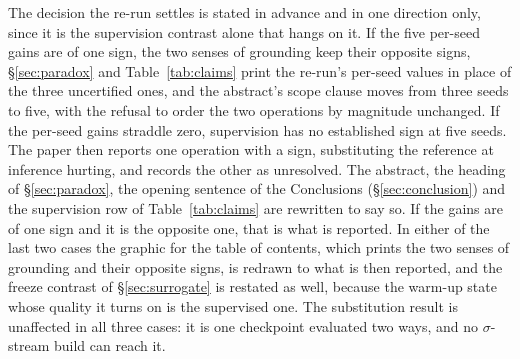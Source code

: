 The decision the re-run settles is stated in advance and in one direction only, since it is the
supervision contrast alone that hangs on it. If the five per-seed gains are of one sign, the two
senses of grounding keep their opposite signs, \S\ref{sec:paradox} and
Table~\ref{tab:claims} print the re-run's per-seed values in place of the three uncertified ones,
and the abstract's scope clause moves from three seeds to five, with the refusal to order the two
operations by magnitude unchanged. If the per-seed gains straddle zero, supervision has no established sign at five seeds. The paper
then reports one operation with a sign, substituting the reference at inference hurting, and records
the other as unresolved. The abstract, the heading of \S\ref{sec:paradox}, the opening sentence of
the Conclusions (\S\ref{sec:conclusion}) and the supervision row of Table~\ref{tab:claims} are
rewritten to say so.
If the gains are of one sign and it is the opposite one, that is what is reported. In either of the
last two cases the graphic for the table of contents, which prints the two senses of grounding and
their opposite signs, is redrawn to what is then reported, and the freeze contrast of
\S\ref{sec:surrogate} is restated as well, because the warm-up state whose quality it turns on is
the supervised one. The substitution result is unaffected in all three cases:
it is one checkpoint evaluated two ways, and no $\sigma$-stream build can reach it.

